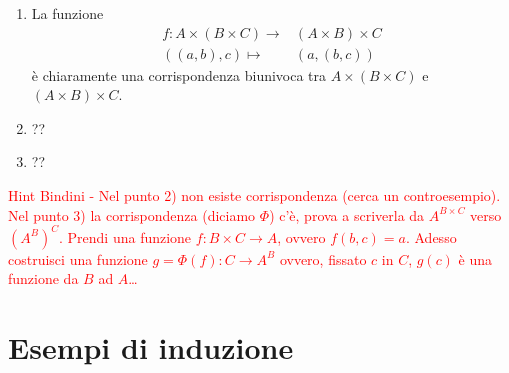 \documentclass[a4paper]{article}\par \usepackage{style}\par
\begin{document}
\begin{enumerate}
\item La funzione
  \begin{align*}
    f \colon A \times (B \times C) \to & (A \times B) \times C \\
    ((a, b), c) \mapsto & (a, (b, c))
  \end{align*}
  è chiaramente una corrispondenza biunivoca tra $ A \times (B \times C) $ e $ (A \times B) \times C $.
\item ??
\item ?? \\
\end{enumerate}\par \textcolor{red}{Hint Bindini - Nel punto 2) non esiste corrispondenza (cerca un controesempio). Nel punto 3) la corrispondenza (diciamo $ \Phi $) c'è, prova a scriverla da $ A^{B\times C} $ verso $ (A^B)^C $. Prendi una funzione $ f \colon B \times C \to A $, ovvero $ f(b, c) = a $. Adesso costruisci una funzione $ g = \Phi(f) \colon C \to A^B $ ovvero, fissato $ c $ in $ C $, $ g(c) $ è una funzione da $ B $ ad $ A $\ldots}\par \section{Esempi di induzione}
\end{document}
